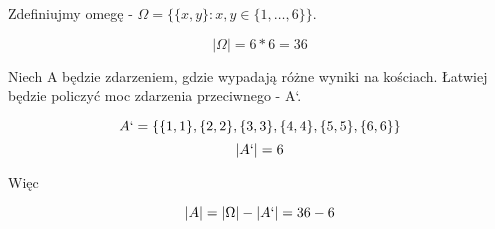 
\medskip
{} 
\medskip

Zdefiniujmy omegę - $\Omega = \{\{x,y\} : x, y \in \{1, \dots , 6\}\}$.

$$|\Omega| = 6 * 6 = 36$$

Niech A będzie zdarzeniem, gdzie wypadają różne wyniki na kościach.
Łatwiej będzie policzyć moc zdarzenia przeciwnego - A`.

$$A` = \{\{1,1\}, \{2,2\}, \{3,3\}, \{4,4\}, \{5,5\}, \{6,6\}\}$$
$$|A`| = 6$$

Więc

$$|A| = |\Omega| - |A`| = 36 - 6$$